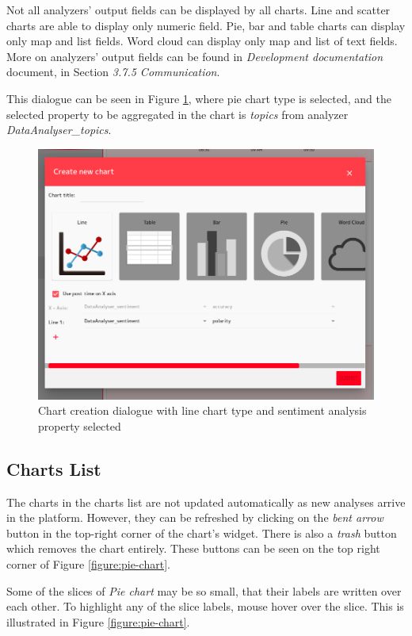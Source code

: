 \documentclass{article}
\begin{document}
Not all analyzers' output fields can be displayed by all charts. Line and scatter charts are able to display only numeric field. Pie, bar and table charts can display only map and list fields. Word cloud can display only map and list of text fields. More on analyzers' output fields can be found in \textit{Development documentation} document, in Section \textit{3.7.5 Communication}.

This dialogue can be seen in Figure \ref{figure:create-chart-dialogue}, where pie chart type is selected, and the selected property to be aggregated in the chart is \textit{topics} from analyzer \textit{DataAnalyser\_topics}.

\begin{figure}[h]
\includegraphics[width=\textwidth]{images/chart_creation_dialogue.png}
\centering
\caption{Chart creation dialogue with line chart type and sentiment analysis property selected}
\label{figure:create-chart-dialogue}
\end{figure}

\subsection{Charts List}
The charts in the charts list are not updated automatically as new analyses arrive in the platform. However, they can be refreshed by clicking on the \textit{bent arrow} button in the top-right corner of the chart's widget. There is also a \textit{trash} button which removes the chart entirely. These buttons can be seen on the top right corner of Figure \ref{figure:pie-chart}.

Some of the slices of \textit{Pie chart} may be so small, that their labels are written over each other. To highlight any of the slice labels, mouse hover over the slice. This is illustrated in Figure \ref{figure:pie-chart}.
\end{document}
